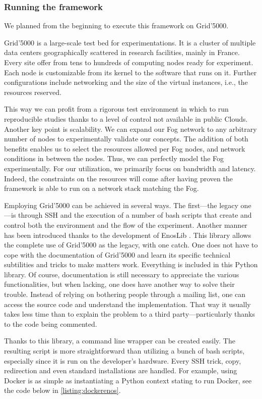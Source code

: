\subsubsection{Running the framework}

We planned from the beginning to execute this framework on Grid'5000.

Grid'5000 is a large-scale test bed for experimentations. It is a cluster of multiple data centers geographically scattered in research facilities, mainly in France. Every site offer from tens to hundreds of computing nodes ready for experiment. Each node is customizable from its kernel to the software that runs on it. Further configurations include networking and the size of the virtual instances, i.e., the resources reserved.

This way we can profit from a rigorous test environment in which to run reproducible studies thanks to a level of control not available in public Clouds. Another key point is scalability. We can expand our Fog network to any arbitrary number of nodes to experimentally validate our concepts. The addition of both benefits enables us to select the resources allowed per Fog nodes, and network conditions in between the nodes. Thus, we can perfectly model the Fog experimentally. For our utilization, we primarily focus on bandwidth and latency. Indeed, the constraints on the resources will come after having proven the framework is able to run on a network stack matching the Fog.

Employing Grid'5000 can be achieved in several ways. The first—the legacy one—is through SSH and the execution of a number of bash scripts that create and control both the environment and the flow of the experiment.
Another manner has been introduced thanks to the development of EnosLib \cite{cherrueau_enoslib_2022}. This library allows the complete use of Grid'5000 as the legacy, with one catch. One does not have to cope with the documentation of Grid'5000 and learn its specific technical subtilities and tricks to make matters work. Everything is included in this Python library. Of course, documentation is still necessary to appreciate the various functionalities, but when lacking, one does have another way to solve their trouble. Instead of relying on bothering people through a mailing list, one can access the source code and understand the implementation. That way it usually takes less time than to explain the problem to a third party—particularly thanks to the code being commented.

Thanks to this library, a command line wrapper can be created easily. The resulting script is more straightforward than utilizing a bunch of bash scripts, especially since it is run on the developer's hardware. Every SSH trick, copy, redirection and even standard installations are handled. For example, using Docker is as simple as instantiating a Python context stating to run Docker, see the code below in \cref{listing:dockerenos}.

